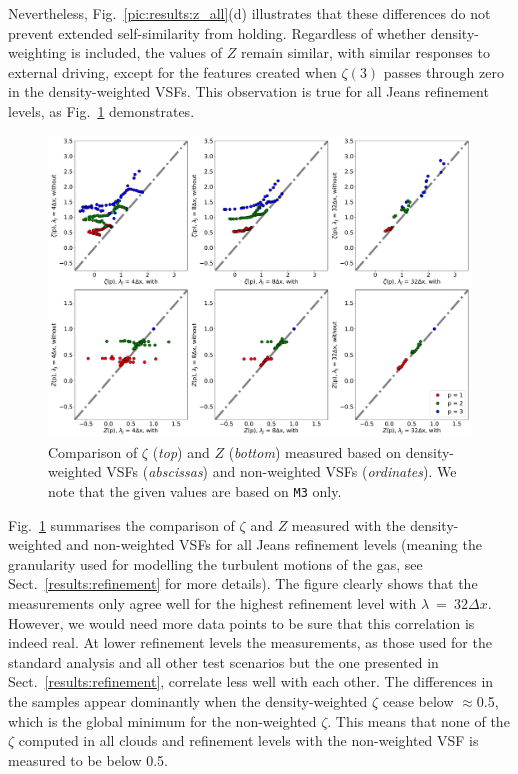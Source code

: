 \documentclass{aa}		%
\begin{document}
Nevertheless, Fig.~\ref{pic:results:z_all}(d) illustrates that these differences do not prevent extended self-similarity from holding. 
Regardless of whether density-weighting is included, the values of $Z$ remain similar, with similar responses to external driving, except for the features created when $\zeta(3)$ passes through zero in the density-weighted VSFs.
This observation is true for all Jeans refinement levels, as Fig.~\ref{pic:results:comp_weighting} demonstrates.


\begin{figure}
	\centering
    \includegraphics[width=\textwidth]{comp_weighting.pdf}
    \caption{ Comparison of $\zeta$ (\textit{top}) and $Z$ (\textit{bottom}) measured based on density-weighted VSFs (\textit{abscissas}) and non-weighted VSFs (\textit{ordinates}). We note that the given values are based on \texttt{M3} only.}
    \label{pic:results:comp_weighting}
\end{figure}

Fig.~\ref{pic:results:comp_weighting} summarises the comparison of $\zeta$ and $Z$ measured with the density-weighted and non-weighted VSFs for all Jeans refinement levels (meaning the granularity used for modelling the turbulent motions of the gas, see Sect.~\ref{results:refinement} for more details).
The figure clearly shows that the measurements only agree well for the highest refinement level with $\lambda~=~32\Delta x$.
However, we would need more data points to be sure that this correlation is indeed real.
At lower refinement levels the measurements, as those used for the standard analysis and all other test scenarios but the one presented in Sect.~\ref{results:refinement}, correlate less well with each other. 
The differences in the samples appear dominantly when the density-weighted $\zeta$ cease below $\approx$0.5, which is the global minimum for the non-weighted $\zeta$. 
This means that none of the $\zeta$ computed in all clouds and refinement levels with the non-weighted VSF is measured to be below 0.5.
\end{document}

